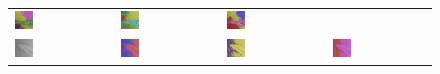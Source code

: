 \begin{figure}[h!]
\begin{tabular}{C{0.24\textwidth}C{0.24\textwidth}C{0.24\textwidth}C{0.24\textwidth}}
		\includegraphics[width=0.2\textwidth]{images/gen/pooling_layers/p03_02.png_1.png} &
		\includegraphics[width=0.2\textwidth]{images/gen/pooling_layers/p03_02.png_2.png} &
		\includegraphics[width=0.2\textwidth]{images/gen/pooling_layers/p03_02.png_4.png} \\
		\includegraphics[width=0.2\textwidth]{images/p03/p03_03.png} &
		\includegraphics[width=0.2\textwidth]{images/gen/pooling_layers/p03_03.png_1.png} &
		\includegraphics[width=0.2\textwidth]{images/gen/pooling_layers/p03_03.png_2.png} &
		\includegraphics[width=0.2\textwidth]{images/gen/pooling_layers/p03_03.png_4.png} \\

\end{tabular}
\end{figure}
